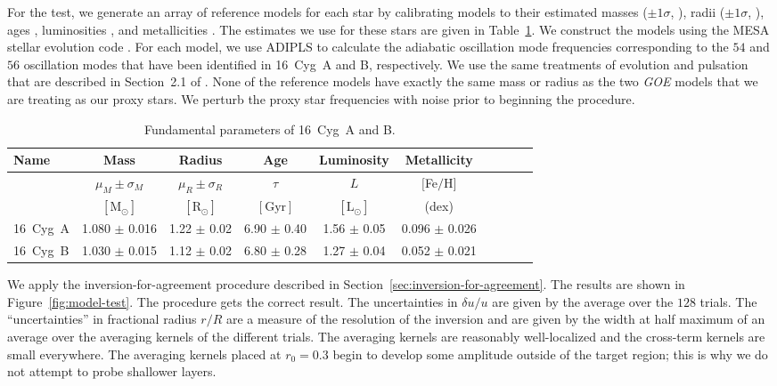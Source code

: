 For the test, we generate an array of reference models for each star by calibrating models to their estimated masses (${\pm 1 \sigma}$, \citealt{2016apj...830...31b}), radii (${\pm 1 \sigma}$, \citealt{2013MNRAS.433.1262W}), ages \citep{2016apj...830...31b}, luminosities \citep{2013MNRAS.433.1262W}, and metallicities \citep{2009A&A...508L..17R}. 
The estimates we use for these stars are given in Table~\ref{tab:stellar-parameters}. 
We construct the models using the MESA stellar evolution code \citep[\emph{Modules for Experiments in Stellar Astrophysics},][]{2011apjs..192....3p}. 
For each model, we use ADIPLS \citep[\emph{the Aarhus adiabatic oscillation package},][]{2008Ap&SS.316..113C} to calculate the adiabatic oscillation mode frequencies corresponding to the $54$ and $56$ oscillation modes that have been identified in 16~Cyg~A and B, respectively. 
We use the same treatments of evolution and pulsation that are described in Section~2.1 of \citealt{2016apj...830...31b}. 
None of the reference models have exactly the same mass or radius as the two \emph{GOE} models that we are treating as our proxy stars. 
We perturb the proxy star frequencies with noise prior to beginning the procedure. 


\begin{table}
\caption{Fundamental parameters of 16~Cyg~A and B. \label{tab:stellar-parameters}}
\hspace*{-0.4cm}
\begin{tabular}{l|ccccccccc} %
    Name &
    Mass &
    Radius &
    Age &
    Luminosity &
    Metallicity &
    \\ \hline
    &
    $\mu_M \pm \sigma_M$ &
    $\mu_R \pm \sigma_R$ &
    $\tau$ &
    $L$ &
    $[$Fe$/$H$]$ &
    \\
    &
    $[\text{M}_\odot]$ &
    $[\text{R}_\odot]$ &
    $[\text{Gyr}]$ &
    $[\text{L}_\odot]$ &
    (dex) \\ \hline%
    16~Cyg~A & 1.080 $\pm$ 0.016 & 1.22 $\pm$ 0.02 & 6.90 $\pm$ 0.40 & 1.56 $\pm$ 0.05 & 0.096 $\pm$ 0.026 \\ 
    16~Cyg~B & 1.030 $\pm$ 0.015 & 1.12 $\pm$ 0.02 & 6.80 $\pm$ 0.28 & 1.27 $\pm$ 0.04 & 0.052 $\pm$ 0.021 \\ \hline
\end{tabular}
\end{table}


We apply the inversion-for-agreement procedure described in Section~\ref{sec:inversion-for-agreement}. 
The results are shown in Figure~\ref{fig:model-test}. 
The procedure gets the correct result. 
The uncertainties in ${\delta u/u}$ are given by the average over the $128$ trials. 
The ``uncertainties'' in fractional radius ${r/R}$ are a measure of the resolution of the inversion and are given by the width at half maximum of an average over the averaging kernels of the different trials. 
The averaging kernels are reasonably well-localized and the cross-term kernels are small everywhere. 
The averaging kernels placed at ${r_0=0.3}$ begin to develop some amplitude outside of the target region; this is why we do not attempt to probe shallower layers. 



